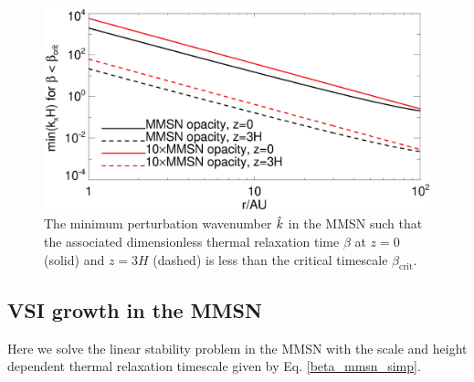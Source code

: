 
\begin{figure}
  \includegraphics[width=\linewidth]{figures/bcrit_mink} 
  \caption{The minimum perturbation wavenumber $\hat{k}$ in
    the MMSN such that the associated dimensionless thermal
    relaxation time $\beta$ at $z=0$ (solid) and $z=3H$ (dashed) is
    less than the critical timescale $\beta_\mathrm{crit}$.   
    \label{mmsn_bcrit_bcool_mink}}   
\end{figure}  

\subsection{VSI growth in the MMSN}\label{vsi_mmsn_grow}
Here we solve the linear stability problem in the MMSN with the scale and
height dependent thermal relaxation timescale given by
Eq. \ref{beta_mmsn_simp}. 



